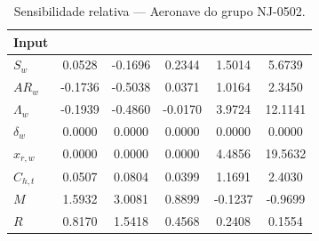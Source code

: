 \begin{table}[H]
\centering
\caption{Sensibilidade relativa --- Aeronave do grupo NJ-0502.}
\label{tab:sens_my_airplane}
\small
\begin{tabular}{l|ccccc}
\toprule
Input &  &  &  &  &  \\
\midrule
$S_w$ & 0.0528 & -0.1696 & 0.2344 & 1.5014 & 5.6739 \\
$AR_w$ & -0.1736 & -0.5038 & 0.0371 & 1.0164 & 2.3450 \\
$\Lambda_w$ & -0.1939 & -0.4860 & -0.0170 & 3.9724 & 12.1141 \\
$\delta_w$ & 0.0000 & 0.0000 & 0.0000 & 0.0000 & 0.0000 \\
$x_{r,w}$ & 0.0000 & 0.0000 & 0.0000 & 4.4856 & 19.5632 \\
$C_{h,t}$ & 0.0507 & 0.0804 & 0.0399 & 1.1691 & 2.4030 \\
$M$ & 1.5932 & 3.0081 & 0.8899 & -0.1237 & -0.9699 \\
$R$ & 0.8170 & 1.5418 & 0.4568 & 0.2408 & 0.1554 \\
\bottomrule
\end{tabular}
\end{table}